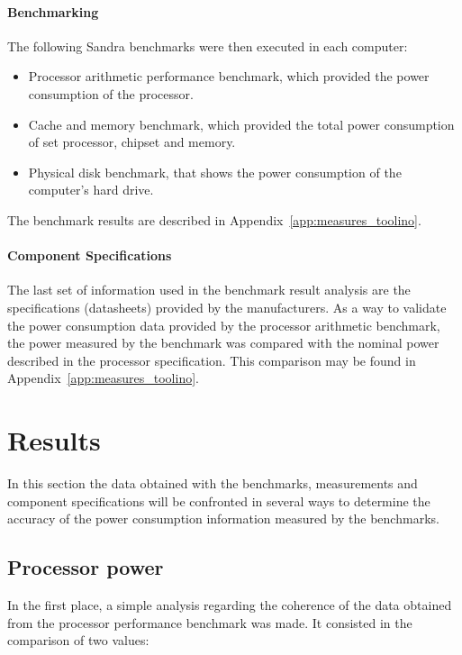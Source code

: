     \paragraph*{Benchmarking}
        The following Sandra benchmarks were then executed in each computer:
        \begin{itemize}
            \item Processor arithmetic performance benchmark, which provided the power consumption of the processor.
            \item Cache and memory benchmark, which provided the total power consumption of set processor, chipset and memory.
            \item Physical disk benchmark, that shows the power consumption of the computer's hard drive.
        \end{itemize}
            
        The benchmark results are described in Appendix~\ref{app:measures_toolino}.
            
    \paragraph*{Component Specifications}
        The last set of information used in the benchmark result analysis are the specifications (datasheets) provided by the  manufacturers.
        As a way to validate the power consumption data provided by the processor arithmetic benchmark, the power measured by the benchmark was compared with the nominal power described in the processor specification. This comparison may be found in Appendix~\ref{app:measures_toolino}.
                        
            
\section{Results} \label{sec4:results}
    In this section the data obtained with the benchmarks, measurements and component specifications will be confronted in several ways to determine the accuracy of the power consumption information measured by the benchmarks.
    
    \subsection{Processor power} \label{sec4:processor_power}
        In the first place, a simple analysis regarding the coherence of the data obtained from the processor performance benchmark was made. It consisted in the comparison of two values:
        
